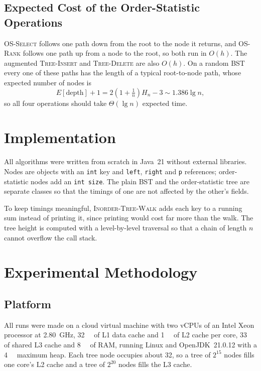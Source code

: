 \documentclass[conference]{IEEEtran}
\newcommand{\INS}{\textsc{Tree-Insert}}
\newcommand{\DEL}{\textsc{Tree-Delete}}
\newcommand{\WALK}{\textsc{Inorder-Tree-Walk}}
\newcommand{\SEL}{\textsc{OS-Select}}
\newcommand{\RANK}{\textsc{OS-Rank}}
\begin{document}
\subsection{Expected Cost of the Order-Statistic Operations}

\SEL{} follows one path down from the root to the node it returns, and
\RANK{} follows one path up from a node to the root, so both run in $O(h)$.
The augmented \INS{} and \DEL{} are also $O(h)$. On a random BST every one of
these paths has the length of a typical root-to-node path, whose expected
number of nodes is
\begin{equation}
E[\text{depth}] + 1 = 2\left(1 + \tfrac{1}{n}\right)H_n - 3 \sim 1.386\lg n,
\label{eq:depth}
\end{equation}
so all four operations should take $\Theta(\lg n)$ expected time.

\section{Implementation}

All algorithms were written from scratch in Java~21 without external
libraries. Nodes are objects with an \texttt{int} key and \texttt{left},
\texttt{right} and \texttt{p} references; order-statistic nodes add an
\texttt{int size}. The plain BST and the order-statistic tree are separate
classes so that the timings of one are not affected by the other's fields.

To keep timings meaningful, \WALK{} adds each key to a running sum instead of
printing it, since printing would cost far more than the walk. The tree height
is computed with a level-by-level traversal so that a chain of length $n$
cannot overflow the call stack.

\section{Experimental Methodology}

\subsection{Platform}

All runs were made on a cloud virtual machine with two vCPUs of an Intel Xeon
processor at \SI{2.80}{\giga\hertz}, \SI{32}{\kibi\byte} of L1 data cache and
\SI{1}{\mebi\byte} of L2 cache per core, \SI{33}{\mebi\byte} of shared L3
cache and \SI{8}{\giga\byte} of RAM, running Linux and OpenJDK~21.0.12 with a
\SI{4}{\gibi\byte} maximum heap. Each tree node occupies about
\SI{32}{\byte}, so a tree of $2^{15}$ nodes fills one core's L2 cache and a
tree of $2^{20}$ nodes fills the L3 cache.
\end{document}

